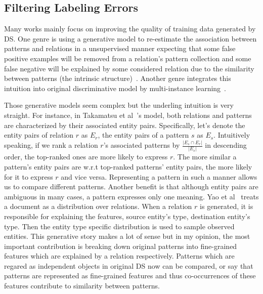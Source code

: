 \documentclass[10pt]{article} %
\theoremstyle{definition}
\theoremstyle{definition}
\begin{document}
\subsection{Filtering Labeling Errors}
Many works mainly focus on improving the quality of training data generated by DS. 
One genre is using a generative model to re-estimate the association between patterns and relations in a unsupervised manner expecting that some false positive examples will be removed from a relation's pattern collection and some false negative will be explained by some considered relation  
due to the similarity between patterns (the intrinsic structure)~\cite{takagenerative, yaolda, topicmodel}. 
Another genre integrates this intuition into original discriminative model by multi-instance learning~\cite{riedel, hoffmann, surdeanu, 4layers}. 



Those generative models seem complex but the underling intuition is very straight. 
For instance, in Takamatsu et al~\cite{takagenerative}'s model, both relations and patterns are characterized by their associated entity pairs. 
Specifically, let's denote the entity pairs of relation $r$ as $E_r$, the entity pairs of a pattern $s$ as $E_s$. 
Intuitively speaking, if we rank a relation $r$'s associated patterns by $\frac{\vert E_s \cap E_r \vert}{\vert E_s \vert}$ in descending order, the top-ranked ones are more likely to express $r$. 
The more similar a pattern's entity pairs are w.r.t top-ranked patterns' entity pairs, the more likely for it to express $r$ and vice versa. 
Representing a pattern in such a manner allows us to compare different patterns. 
Another benefit is that although entity pairs are ambiguous in many cases, a pattern expresses only one meaning. 
Yao et al~\cite{yaolda} treats a document as a distribution over relations. 
When a relation $r$ is generated, it is responsible for explaining the features, source entity's type, destination entity's type. 
Then the entity type specific distribution is used to sample observed entities. 
This generative story makes a lot of sense but in my opinion, the most important contribution is breaking down original patterns into fine-grained features which are explained by a relation respectively. 
Patterns which are regared as independent objects in original DS now can be compared, 
or say that patterns are represented as fine-grained features and thus co-occurrences of these features contribute to similarity between patterns. 
\end{document}
